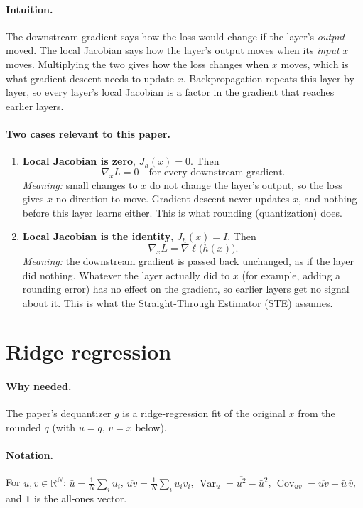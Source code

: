 \documentclass[11pt]{article}
\newcommand{\R}{\mathbb{R}}
\begin{document}
\paragraph{Intuition.} The downstream gradient says how the loss would change if the layer's \emph{output} moved. The local Jacobian says how the layer's output moves when its \emph{input} $x$ moves. Multiplying the two gives how the loss changes when $x$ moves, which is what gradient descent needs to update $x$. Backpropagation repeats this layer by layer, so every layer's local Jacobian is a factor in the gradient that reaches earlier layers.

\paragraph{Two cases relevant to this paper.}
\begin{enumerate}
\item \textbf{Local Jacobian is zero}, $J_h(x)=0$. Then
\[
\nabla_x L = 0 \quad\text{for every downstream gradient}.
\]
\emph{Meaning:} small changes to $x$ do not change the layer's output, so the loss gives $x$ no direction to move. Gradient descent never updates $x$, and nothing before this layer learns either. This is what rounding (quantization) does.

\item \textbf{Local Jacobian is the identity}, $J_h(x)=I$. Then
\[
\nabla_x L = \nabla \ell\big(h(x)\big).
\]
\emph{Meaning:} the downstream gradient is passed back unchanged, as if the layer did nothing. Whatever the layer actually did to $x$ (for example, adding a rounding error) has no effect on the gradient, so earlier layers get no signal about it. This is what the Straight-Through Estimator (STE) assumes.
\end{enumerate}

\section{Ridge regression}

\paragraph{Why needed.} The paper's dequantizer $g$ is a ridge-regression fit of the original $x$ from the rounded $q$ (with $u=q$, $v=x$ below).

\paragraph{Notation.} For $u,v\in\R^N$: $\bar u=\frac1N\sum_i u_i$, $\overline{uv}=\frac1N\sum_i u_iv_i$, $\operatorname{Var}_u=\overline{u^2}-\bar u^{2}$, $\operatorname{Cov}_{uv}=\overline{uv}-\bar u\,\bar v$, and $\mathbf 1$ is the all-ones vector.
\end{document}
